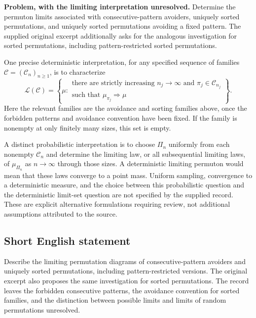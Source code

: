 \documentclass[11pt]{article}
\begin{document}
\textbf{Problem, with the limiting interpretation unresolved.} Determine the permuton limits associated with consecutive-pattern avoiders, uniquely sorted permutations, and uniquely sorted permutations avoiding a fixed pattern. The supplied original excerpt additionally asks for the analogous investigation for sorted permutations, including pattern-restricted sorted permutations.

One precise deterministic interpretation, for any specified sequence of families \(\mathcal C=(\mathcal C_n)_{n\geq1}\), is to characterize
\[
\mathcal L(\mathcal C)=\left\{\mu:\begin{array}{l}
\text{there are strictly increasing }n_j\to\infty\text{ and }\pi_j\in\mathcal C_{n_j}\\
\text{such that }\mu_{\pi_j}\Rightarrow\mu
\end{array}\right\}.
\]
Here the relevant families are the avoidance and sorting families above, once the forbidden patterns and avoidance convention have been fixed. If the family is nonempty at only finitely many sizes, this set is empty.

A distinct probabilistic interpretation is to choose \(\Pi_n\) uniformly from each nonempty \(\mathcal C_n\) and determine the limiting law, or all subsequential limiting laws, of \(\mu_{\Pi_n}\) as \(n\to\infty\) through those sizes. A deterministic limiting permuton would mean that these laws converge to a point mass. Uniform sampling, convergence to a deterministic measure, and the choice between this probabilistic question and the deterministic limit-set question are not specified by the supplied record. These are explicit alternative formulations requiring review, not additional assumptions attributed to the source.
\subsection{Short English statement}
Describe the limiting permutation diagrams of consecutive-pattern avoiders and uniquely sorted permutations, including pattern-restricted versions. The original excerpt also proposes the same investigation for sorted permutations. The record leaves the forbidden consecutive patterns, the avoidance convention for sorted families, and the distinction between possible limits and limits of random permutations unresolved.
\end{document}
